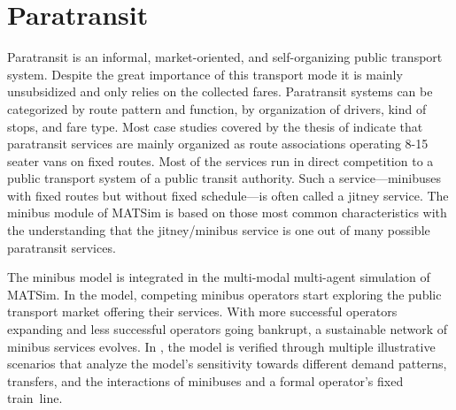 %
\section{Paratransit}
\label{sec:paratransit}
%
Paratransit is an informal, market-oriented, and self-organizing public transport system. Despite the great importance of this transport mode it is mainly unsubsidized and only relies on the collected fares. 
Paratransit systems can be categorized by route pattern and function, by organization of drivers, kind of stops, and fare type. Most case studies covered by the thesis of \citet[][]{Neumann_PhDThesis_2014} indicate that paratransit services are mainly organized as route associations operating 8-15\,seater vans on fixed routes. Most of the services run in direct competition to a
public transport system of a public transit authority. Such a service---minibuses with fixed routes but without fixed schedule---is often called a jitney service.
The minibus module of MATSim is based on those most common characteristics with the understanding that the jitney/minibus
service is one out of many possible paratransit services.

The minibus model is integrated in the multi-modal multi-agent simulation of MATSim. In the model, competing minibus operators start exploring the public transport market offering their services. With more successful operators expanding and less successful operators going bankrupt, a sustainable network of minibus services evolves. In \citet[][]{Neumann_PhDThesis_2014}, the model is verified through multiple illustrative scenarios that analyze the model's sensitivity towards different demand patterns, transfers, and the interactions of minibuses and a formal operator's fixed train~line.

